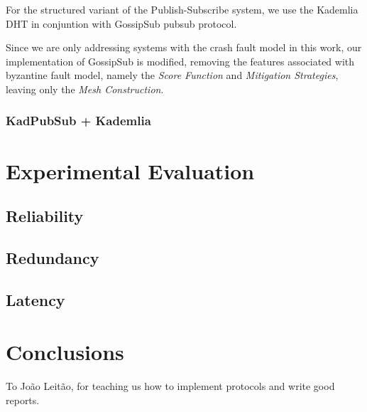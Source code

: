 \documentclass[sigconf]{acmart}
\begin{document}
For the structured variant of the Publish-Subscribe system, we use the Kademlia DHT in conjuntion with GossipSub pubsub protocol.

Since we are only addressing systems with the crash fault model in this work, our implementation of GossipSub is modified, removing the features associated with byzantine fault model, namely the \textit{Score Function} and \textit{Mitigation Strategies}, leaving only the \textit{Mesh Construction}.

% 
% 
% 



% 

\subsubsection{KadPubSub + Kademlia} %

\section{Experimental Evaluation}




\subsection{Reliability}



\subsection{Redundancy}

\subsection{Latency}

\section{Conclusions}

\begin{acks}
    To João Leitão, for teaching us how to implement protocols and write good reports.
\end{acks}



\end{document}
